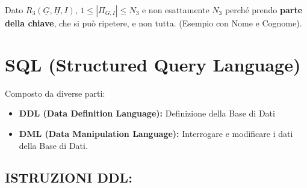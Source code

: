 \documentclass{article}
\begin{document}
Dato $R_3(\underline{G},\underline{{H}},I)$, $1 \leq |\Pi_{G,I}| \leq N_3$ e non esattamente $N_3$ perché prendo \textbf{parte della chiave}, che si può ripetere, e non tutta. (Esempio con Nome e Cognome).

\newpage
\section{SQL (Structured Query Language)}
Composto da diverse parti: \begin{itemize}
    \item \textbf{DDL (Data Definition Language):} Definizione della Base di Dati
    \item \textbf{DML (Data Manipulation Language):} Interrogare e modificare i dati della Base di Dati.
\end{itemize}
\subsection{ISTRUZIONI DDL:}
\end{document}
